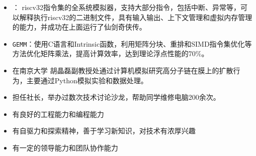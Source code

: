\documentclass[zh]{resume}
\begin{document}
\begin{itemize}
  \item {}：
riscv32指令集的全系统模拟器，支持大部分指令，包括中断、异常等，可以解释执行riscv32的二进制文件，具有输入输出、上下文管理和虚拟内存管理的能力，并成功在上面运行了仙剑奇侠传。
\item \texttt{GEMM}：使用C语言和Intrinsic函数，利用矩阵分块、重排和SIMD指令集优化等方法优化矩阵乘法，提高计算效率，达到理论浮点性能的70\%。
\end{itemize}

\begin{itemize}
  \item 在南京大学
{胡晶磊副教授}处通过计算机模拟研究高分子链在膜上的扩散行为，主要通过Python模拟实验和数据处理。
\end{itemize}


\begin{itemize}
\item 担任社长，举办过数次技术讨论沙龙，帮助同学维修电脑200余次。
\end{itemize}

\begin{itemize}
  \item 有良好的工程能力和编程能力
  \item 有自驱力和探索精神，善于学习新知识，对技术有浓厚兴趣
\item 有一定的领导能力和团队协作能力
\end{itemize}
\end{document}
